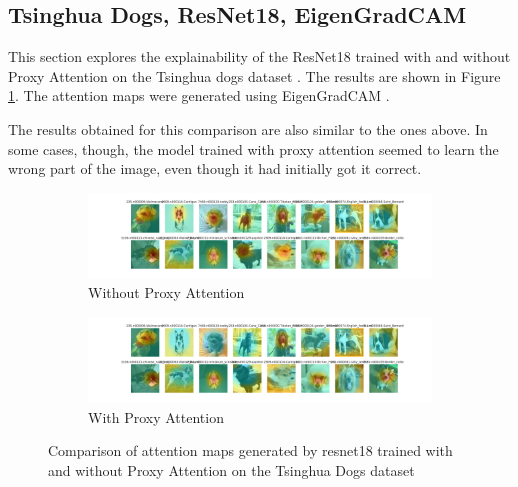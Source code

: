 \subsection{Tsinghua Dogs, ResNet18, EigenGradCAM}
This section explores the explainability of the ResNet18 \cite{heDeepResidualLearning2016} trained with and without Proxy Attention on the Tsinghua dogs dataset \cite{zouNewDatasetDog2020}. The results are shown in Figure \ref{fig:resnet18_tsing}. The attention maps were generated using EigenGradCAM \cite{banymuhammadEigenCAMVisualExplanations2021}.

The results obtained for this comparison are also similar to the ones above. In some cases, though, the model trained with proxy attention seemed to learn the wrong part of the image, even though it had initially got it correct.

\begin{figure}[!htb]
    \begin{subfigure}[b]{1\textwidth}
        \includegraphics[width=\linewidth]{images/tsing_resnet18_noproxy_0.pdf}
        \caption{Without Proxy Attention}
    \end{subfigure}
    \begin{subfigure}[b]{1\textwidth}
        \includegraphics[width=\linewidth]{images/tsing_resnet18_proxy_0.pdf}
        \caption{With Proxy Attention}
    \end{subfigure}
    \caption{Comparison of attention maps generated by resnet18 trained with and without Proxy Attention on the Tsinghua Dogs dataset}
    \label{fig:resnet18_tsing}
\end{figure}



